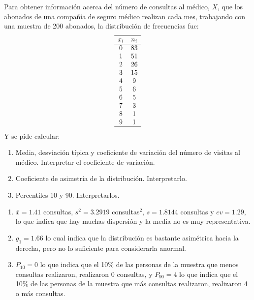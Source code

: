 {Para obtener información acerca del número de consultas al médico, $X$, que los abonados de una compañía de seguro médico realizan cada mes, trabajando con una muestra de 200 abonados, la distribución de frecuencias fue:
\[
\begin{array}{cc}
\hline
x_i & n_i \\
\hline
0 & 83\\
1 & 51\\
2 & 26\\
3 & 15\\
4 & 9\\
5 & 6\\
6 & 5\\
7 & 3\\
8 & 1\\
9 & 1\\
\hline
\end{array}
\]
Y se pide calcular:
\begin{enumerate}
\item Media, desviación típica y coeficiente de variación del número de visitas al médico. Interpretar el coeficiente de variación.
\item Coeficiente de asimetría de la distribución. Interpretarlo.
\item Percentiles 10 y 90. Interpretarlos.
\end{enumerate}
}
{\begin{enumerate}
\item $\bar x=1.41$ consultas, $s^2=3.2919$ consultas$^2$, $s=1.8144$ consultas y $cv=1.29$, lo que indica que hay muchas dispersión y la
media no es muy representativa.
\item $g_1=1.66$ lo cual indica que la distribución es bastante asimétrica hacia la derecha, pero no lo suficiente para considerarla
anormal.
\item $P_{10}=0$ lo que indica que el 10\% de las personas de la muestra que menos consultas realizaron, realizaron 0 consultas, y $P_{90}=4$ lo que indica que el 10\% de las personas de la muestra que más consultas realizaron, realizaron 4 o más consultas.
\end{enumerate}
}
{}


